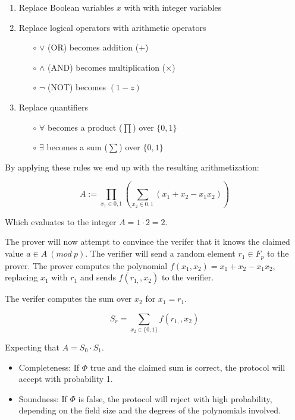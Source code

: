 \documentclass{article}
\begin{document}
\begin{enumerate}
        \item Replace Boolean variables $x$ with with integer variables
        \item Replace logical operators with arithmetic operators
          \begin{itemize}
            \item[$\circ$] $\lor$ (OR) becomes addition ($+$)
            \item[$\circ$] $\land$ (AND) becomes multiplication ($\times$)
            \item[$\circ$] $\lnot$ (NOT) becomes $(1 - z)$
          \end{itemize}
        \item Replace quantifiers
        \begin{itemize}
            \item[$\circ$] $\forall$ becomes a product ($\prod$) over $\{0,1\}$
            \item[$\circ$] $\exists$ becomes a sum ($\sum$) over $\{0,1\}$
        \end{itemize}
\end{enumerate}

By applying these rules we end up with the resulting arithmetization:

$$
A := \prod_{x_1 \in {0,1}}  \left(\sum_{x_2 \in {0,1}}(x_{1} + x_{2} - x_{1}x_{2})\right)
$$

Which evaluates to the integer $A=1 \cdot 2=2$.

The prover will now attempt to convince the verifer that it knows the claimed
value $a \in A \ (mod \ p)$.  The verifier will send a random element $r_{1} \in F_{p}$ to the prover.  The prover computes the polynomial $f(x_{1}, x_{2}) =
x_{1} + x_{2} - x_{1}x_{2}$, replacing $x_{1}$ with $r_{1}$ and sends $f(r_{1,}, x_{2})$ to the verifier.

The verifer computes the sum over $x_{2}$ for $x_{1} = r_{1}$.

$$
S_{r} = \sum_{x_{2} \in \{0,1\}} f(r_{1,}, x_{2})
$$

Expecting that $A=S_{0} \cdot S_{1}$.

\begin{itemize}
        \item Completeness: If $\Phi$ true and the claimed sum is correct, the protocol will accept with probability 1.
        \item Soundness: If $\Phi$ is false, the protocol will reject with high probability, depending on the field size and the degrees of the polynomials involved.
\end{itemize}
\end{document}
